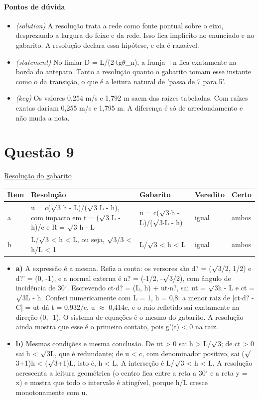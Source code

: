 \documentclass{article}%
\begin{document}
\paragraph{Pontos de dúvida}%
\begin{itemize}%
\item%
\textit{(solution)} A resolução trata a rede como fonte pontual sobre o eixo, desprezando a largura do feixe e da rede. Isso fica implícito no enunciado e no gabarito. A resolução declara essa hipótese, e ela é razoável.%
\item%
\textit{(statement)} No limiar D = L/(2$\cdot$tg$\theta$\_n), a franja $\pm$n fica exatamente na borda do anteparo. Tanto a resolução quanto o gabarito tomam esse instante como o da transição, o que é a leitura natural de 'passa de 7 para 5'.%
\item%
\textit{(key)} Os valores 0,254 m/s e 1,792 m saem das raízes tabeladas. Com raízes exatas dariam 0,255 m/s e 1,795 m. A diferença é só de arredondamento e não muda a nota.%
\end{itemize}%
\section*{Questão 9}%
\href{https://poliedroresolve.sistemapoliedro.com.br/vestibulares/ime/2027/ime-2-fase-dia-2-27-10-2026-2-fase-dia-2/dissertativa-9-fisica-2-fase-dia-2-ime-2027}{Resolução do gabarito}\par\smallskip%
\begin{longtable}{@{}p{} p{} p{} p{} p{}@{}}\toprule Item & Resolução & Gabarito & Veredito & Certo \\ \midrule
a & u = c($\surd$3 h - L)/($\surd$3 L - h), com impacto em t = ($\surd$3 L - h)/c e R = $\surd$3 h - L & u = c($\surd$3$\cdot$h - L)/($\surd$3$\cdot$L - h) & igual & ambos \\
b & L/$\surd$3 < h < L, ou seja, $\surd$3/3 < h/L < 1 & L/$\surd$3 < h < L & igual & ambos \\
\bottomrule\end{longtable}%
\begin{itemize}%
\item%
\textbf{a)} A expressão é a mesma. Refiz a conta: os versores são d? = ($\surd$3/2, 1/2) e d?' = (0, -1), e a normal externa é n? = (-1/2, -$\surd$3/2), com ângulo de incidência de 30$^\circ$. Escrevendo ct$\cdot$d? = (L, h) + ut$\cdot$n?, sai ut = $\surd$3h - L e ct = $\surd$3L - h. Conferi numericamente com L = 1, h = 0,8: a menor raiz de |ct$\cdot$d? - C| = ut dá t = 0,932/c, u $\approx$ 0,414c, e o raio refletido sai exatamente na direção (0, -1). O sistema de equações é o mesmo do gabarito. A resolução ainda mostra que esse é o primeiro contato, pois g'(t) < 0 na raiz.%
\item%
\textbf{b)} Mesmas condições e mesma conclusão. De ut > 0 sai h > L/$\surd$3; de ct > 0 sai h < $\surd$3L, que é redundante; de u < c, com denominador positivo, sai ($\surd$3+1)h < ($\surd$3+1)L, isto é, h < L. A interseção é L/$\surd$3 < h < L. A resolução acrescenta a leitura geométrica (o centro fica entre a reta a 30$^\circ$ e a reta y = x) e mostra que todo o intervalo é atingível, porque h/L cresce monotonamente com u.%
\end{itemize}%
\end{document}
